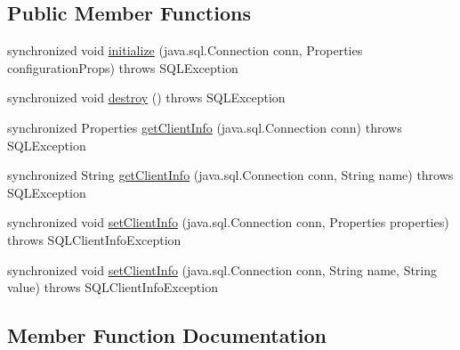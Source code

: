 \subsection*{Public Member Functions}
\begin{DoxyCompactItemize}
\item 
synchronized void \mbox{\hyperlink{classcom_1_1mysql_1_1jdbc_1_1_j_d_b_c4_client_info_provider_s_p_a5b14375f29d2bbe6298559600801cebc}{initialize}} (java.\+sql.\+Connection conn, Properties configuration\+Props)  throws S\+Q\+L\+Exception 
\item 
synchronized void \mbox{\hyperlink{classcom_1_1mysql_1_1jdbc_1_1_j_d_b_c4_client_info_provider_s_p_a0115e7120ff51f36e85b8d4bfb10c3f7}{destroy}} ()  throws S\+Q\+L\+Exception 
\item 
synchronized Properties \mbox{\hyperlink{classcom_1_1mysql_1_1jdbc_1_1_j_d_b_c4_client_info_provider_s_p_a75c1a50050648fcab79401cd73342756}{get\+Client\+Info}} (java.\+sql.\+Connection conn)  throws S\+Q\+L\+Exception 
\item 
synchronized String \mbox{\hyperlink{classcom_1_1mysql_1_1jdbc_1_1_j_d_b_c4_client_info_provider_s_p_a0b8221fb4e29722d7570124d595944fd}{get\+Client\+Info}} (java.\+sql.\+Connection conn, String name)  throws S\+Q\+L\+Exception 
\item 
synchronized void \mbox{\hyperlink{classcom_1_1mysql_1_1jdbc_1_1_j_d_b_c4_client_info_provider_s_p_a21bba24e53b2d29f6cfa456ea0d75d57}{set\+Client\+Info}} (java.\+sql.\+Connection conn, Properties properties)  throws S\+Q\+L\+Client\+Info\+Exception 
\item 
synchronized void \mbox{\hyperlink{classcom_1_1mysql_1_1jdbc_1_1_j_d_b_c4_client_info_provider_s_p_afc850b09b440756a3a5ecc69b8745ce4}{set\+Client\+Info}} (java.\+sql.\+Connection conn, String name, String value)  throws S\+Q\+L\+Client\+Info\+Exception 
\end{DoxyCompactItemize}


\subsection{Member Function Documentation}
\mbox{\label{classcom_1_1mysql_1_1jdbc_1_1_j_d_b_c4_client_info_provider_s_p_a0115e7120ff51f36e85b8d4bfb10c3f7}} 
